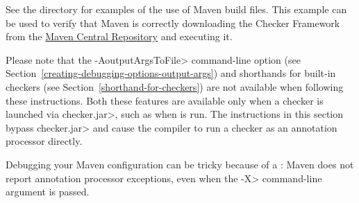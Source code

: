 See the directory  for examples of the use of
Maven build files.
This example can be used to verify that
Maven is correctly downloading the Checker Framework from the
\href{https://central.sonatype.com/search?q=org.checkerframework}{Maven
  Central Repository} and executing it.

Please note that the \<-AoutputArgsToFile> command-line option
(see Section~\ref{creating-debugging-options-output-args}) and shorthands for built-in checkers
(see Section~\ref{shorthand-for-checkers}) are not available when
following these instructions.  Both these features are available only when a checker is
launched via \<checker.jar>, such as when 
is run.  The instructions in this section
bypass \<checker.jar> and cause the compiler to run a
checker as an annotation processor directly.

Debugging your Maven configuration can be tricky because of a
: Maven does not report
annotation processor exceptions, even when
the \<-X> command-line argument is passed.


